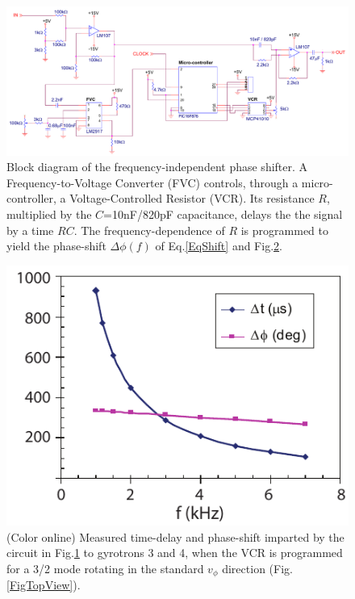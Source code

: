\documentclass[aps,pra,twocolumn]{revtex4}
\begin{document}
\begin{center}
  \begin{figure}[t]
    \includegraphics[scale=0.4]{fig5.pdf} %
    \caption{\label{FigBlockPS} 
      Block diagram of the frequency-independent phase shifter. 
    A Frequency-to-Voltage Converter (FVC) controls, through a 
    micro-controller, a Voltage-Controlled Resistor (VCR). Its resistance $R$,  
    multiplied by the $C$=10nF/820pF capacitance, delays the 
    the signal by a time $RC$. The frequency-dependence of $R$ is programmed 
    to yield the phase-shift $\Delta \phi (f)$ of Eq.\ref{EqShift} and 
    Fig.\ref{FigProgRes}.}
  \end{figure}
\end{center}


\begin{figure}[t]
  \includegraphics[scale=0.85]{fig6.pdf} %
  \caption{\label{FigProgRes} (Color online) 
    Measured time-delay and phase-shift imparted by the circuit in 
    Fig.\ref{FigBlockPS} to gyrotrons 3 and 4, when the VCR is programmed for 
  a 3/2 mode rotating in the standard $v_\phi$ direction (Fig.\ref{FigTopView}).}
\end{figure}
\end{document}
